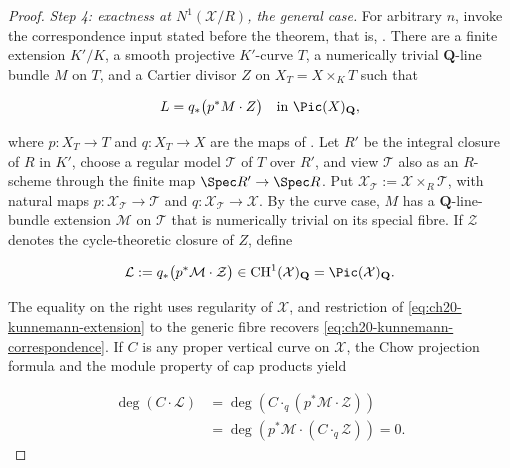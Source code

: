 \begin{proof}
\emph{Step 4: exactness at $N^1(\mathcal X/R)$, the general case.}
For arbitrary $n$, invoke the correspondence input stated before the
theorem, that is, .  There are a finite
extension $K'/K$, a smooth projective $K'$-curve $T$, a numerically
trivial $\mathbf Q$-line bundle $M$ on $T$, and a Cartier divisor
$Z$ on $X_T=X\times_KT$ such that

\begin{equation}
\label{eq:ch20-kunnemann-correspondence}
                  L=q_*\bigl(p^*M\cdot Z\bigr)
                  \quad\text{in }\Pic(X)_{\mathbf Q},
\end{equation}

where $p:X_T\to T$ and $q:X_T\to X$ are the maps of
.  Let $R'$ be the integral closure of
$R$ in $K'$, choose a regular model $\mathcal T$ of $T$ over
$R'$, and view $\mathcal T$ also as an $R$-scheme through the finite
map $\Spec R'\to\Spec R$.  Put
$\mathcal X_{\mathcal T}:=\mathcal X\times_R\mathcal T$, with natural
maps $p:\mathcal X_{\mathcal T}\to\mathcal T$ and
$q:\mathcal X_{\mathcal T}\to\mathcal X$.  By the curve case, $M$
has a $\mathbf Q$-line-bundle extension $\mathcal M$ on
$\mathcal T$ that is numerically trivial on its special fibre.  If
$\mathcal Z$ denotes the cycle-theoretic closure of $Z$, define

\begin{equation}
\label{eq:ch20-kunnemann-extension}
             \mathcal L:=q_*\bigl(p^*\mathcal M\cdot\mathcal Z\bigr)
             \in\operatorname{CH}^1(\mathcal X)_{\mathbf Q}
             =\Pic(\mathcal X)_{\mathbf Q}.
\end{equation}

The equality on the right uses regularity of $\mathcal X$, and restriction
of \eqref{eq:ch20-kunnemann-extension} to the generic fibre recovers
\eqref{eq:ch20-kunnemann-correspondence}.  If $C$ is any proper vertical
curve on $\mathcal X$, the Chow projection formula and the module property
of cap products yield

\begin{equation}
\label{eq:ch20-kunnemann-projection}
 \begin{aligned}
  \deg(C\cdot\mathcal L)
   &=\deg\!\left(C\mathbin{\cdot_q}
          (p^*\mathcal M\cdot\mathcal Z)\right)\\
   &=\deg\!\left(p^*\mathcal M\cdot
          (C\mathbin{\cdot_q}\mathcal Z)\right)=0.
 \end{aligned}
\end{equation}


\end{proof}
